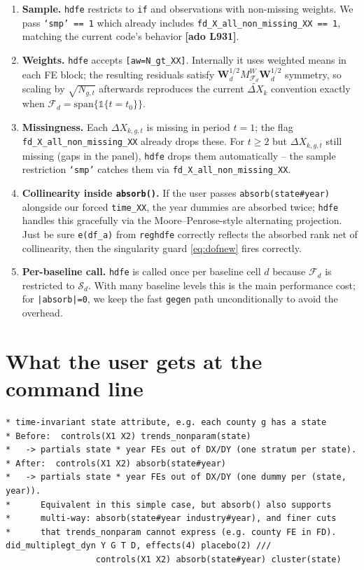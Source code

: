 \documentclass[11pt]{article}
\newcommand{\code}[1]{\texttt{\small #1}}
\newcommand{\Adoref}[1]{\textcolor{accent}{\footnotesize\textbf{[ado L#1]}}}
\newcommand{\1}{\mathbb{1}}
\newcommand{\Smpl}{\mathcal{S}}
\newcommand{\Ngt}{N_{g,t}}
\newcommand{\dXk}{\Delta X_{k,g,t}}
\newcommand{\MdW}{M^{\!W}_{\mathcal{F}_d}}
\begin{document}
\begin{enumerate}[leftmargin=*, itemsep=2pt]
  \item \textbf{Sample.} \texttt{hdfe} restricts to \texttt{if} and
        observations with non-missing weights. We pass
        \code{`smp' == 1} which already includes
        \code{fd\_X\_all\_non\_missing\_XX == 1}, matching the current
        code's behavior \Adoref{931}.
  \item \textbf{Weights.} \texttt{hdfe} accepts \code{[aw=N\_gt\_XX]}.
        Internally it uses weighted means in each FE block; the resulting
        residuals satisfy $\bm{W}_d^{1/2}\MdW \bm{W}_d^{1/2}$ symmetry, so
        scaling by $\sqrt{\Ngt}$ afterwards reproduces the current
        $\widetilde{\Delta X}_{k}$ convention exactly when
        $\mathcal{F}_d = \mathrm{span}\{\1\{t=t_0\}\}$.
  \item \textbf{Missingness.} Each $\dXk$ is missing in period $t=1$; the
        flag \code{fd\_X\_all\_non\_missing\_XX} already drops these. For
        $t \ge 2$ but $\dXk$ still missing (gaps in the panel), \texttt{hdfe}
        drops them automatically -- the sample restriction \texttt{`smp'}
        catches them via \code{fd\_X\_all\_non\_missing\_XX}.
  \item \textbf{Collinearity inside \texttt{absorb()}.} If the user passes
        \code{absorb(state\#year)} alongside our forced \code{time\_XX}, the
        year dummies are absorbed twice; \texttt{hdfe} handles this
        gracefully via the Moore--Penrose-style alternating projection.
        Just be sure \code{e(df\_a)} from \texttt{reghdfe} correctly
        reflects the absorbed rank net of collinearity, then the singularity
        guard \eqref{eq:dofnew} fires correctly.
  \item \textbf{Per-baseline call.} \texttt{hdfe} is called once per
        baseline cell $d$ because $\mathcal{F}_d$ is restricted to
        $\Smpl_d$. With many baseline levels this is the main performance
        cost; for \code{|absorb|=0}, we keep the fast \code{gegen} path
        unconditionally to avoid the overhead.
\end{enumerate}

\section{What the user gets at the command line}

\begin{lstlisting}
* time-invariant state attribute, e.g. each county g has a state
* Before:  controls(X1 X2) trends_nonparam(state)
*   -> partials state * year FEs out of DX/DY (one stratum per state).
* After:  controls(X1 X2) absorb(state#year)
*   -> partials state * year FEs out of DX/DY (one dummy per (state, year)).
*      Equivalent in this simple case, but absorb() also supports
*      multi-way: absorb(state#year industry#year), and finer cuts
*      that trends_nonparam cannot express (e.g. county FE in FD).
did_multiplegt_dyn Y G T D, effects(4) placebo(2) ///
                  controls(X1 X2) absorb(state#year) cluster(state)
\end{lstlisting}
\end{document}
